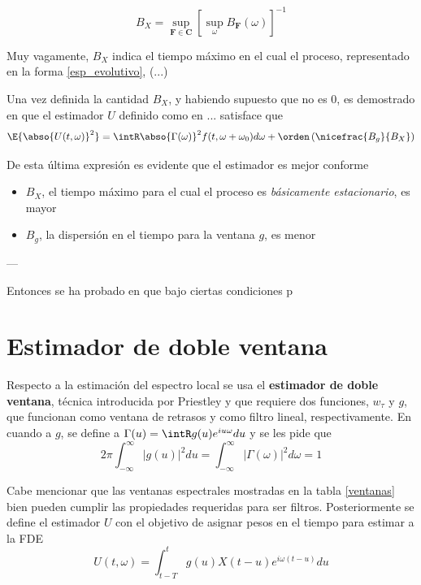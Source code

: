 \begin{equation}
B_X = \sup_{\mathbf{F}\in \mathbf{C}} \left[ \sup_\omega B_{\mathbf{F}}(\omega) \right]^{-1}
\end{equation}

Muy vagamente, $B_X$ indica el tiempo máximo en el cual el proceso, representado en la forma
\ref{esp_evolutivo}, (...)

Una vez definida la cantidad $B_X$, y habiendo supuesto que no es 0, es demostrado en 
\cite{Priestley65} que el estimador $U$ definido como en ... satisface que
%
\begin{equation}
\E{\abso{U(t,\omega)}^{2}} = \intR \abso{\Gamma(\omega)}^{2} f(t,\omega+\omega_0) d\omega
+ \orden\left( \nicefrac{B_g}{B_X} \right)
\end{equation}

De esta última expresión es evidente que el estimador es mejor conforme 
\begin{itemize}
\item  $B_X$, el tiempo máximo para el cual el proceso es \textit{básicamente estacionario}, es 
mayor
\item $B_g$, la dispersión en el tiempo para la ventana $g$, es menor
\end{itemize}

---

Entonces se ha probado en \cite{Priestley66,Priestley69} que bajo ciertas
condiciones p

\section{Estimador de doble ventana}

Respecto a la estimación del espectro local se usa el \textbf{estimador de doble ventana}, 
técnica introducida por Priestley \cite{Priestley69} y que requiere dos funciones, $w_\tau$ y 
$g$, que funcionan como ventana de retrasos y como filtro lineal, respectivamente.
%
En cuando a $g$, se define a $\Gamma(u) = \intR g(u) e^{i u \omega} du$ y se les pide que
\begin{equation*}
2\pi \int_{-\infty}^{\infty} \lvert g(u) \lvert^{2} du 
= 
\int_{-\infty}^{\infty} \lvert \Gamma(\omega) \lvert^{2} d\omega
= 1
\end{equation*}

Cabe mencionar que las ventanas espectrales mostradas en la tabla \ref{ventanas} bien 
pueden cumplir las propiedades requeridas para ser filtros.
Posteriormente se define el estimador $U$ con el objetivo de asignar pesos en el tiempo para estimar
a la FDE
\begin{equation*}
U(t,\omega) = \int_{t-T}^{t} g(u) X({t-u}) e^{i \omega (t-u)} du
\end{equation*}

